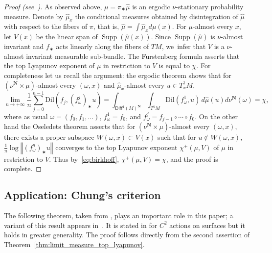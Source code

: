 \documentclass[11pt]{article}
\newcommand{\norm}[1]{{\left\Vert#1\right\Vert}}
\newcommand{\unsur}[1]{\frac{1}{#1}}
\DeclareMathOperator{\supp}{Supp}
\def\N{\mathbf{N}}
\newcommand{\dil}{{\mathrm{Dil}}}
\newcommand\Diff{{\mathsf{Diff}}}
\theoremstyle{plain}
\theoremstyle{definition}
\numberwithin{equation}{section}
\begin{document}
\begin{proof}[Proof (see~\cite{chung, hurtado:burnside})]
As observed above, $\mu = \pi_\varstar \hat \mu$ is an
ergodic $\nu$-stationary probability measure. Denote by $\hat\mu_x$ the conditional measures obtained
by disintegration of $\hat\mu$ with respect to the fibers of $\pi$, that is,
$\hat\mu = \int \hat\mu_x d\mu(x)$. For $\mu$-almost every $x$, let $V(x)$ be the linear span of
$\supp(\hat \mu(x))$. Since $\supp(\hat\mu)$ is $\nu$-almost invariant and
$f_\varstar $ acts linearly along the fibers of $TM$, we~infer that $V$ is a $\nu$-almost invariant
measurable sub-bundle. The Furstenberg formula asserts that
the top Lyapunov exponent of $\mu$ in restriction
to $V$ is equal to $\chi$. For completeness let us recall the argument:
the ergodic theorem shows that for $(\nu^\N\times \mu)$-almost every $(\omega, x)$
and $\hat\mu_x$-almost every $u\in T^1_xM$,\vspace*{-3pt}
\begin{equation}\label{eq:birkhoff}
\lim_{n\to + \infty} \frac{1}{n} \sum_{j=0}^{n-1} \dil\left( f_j, (f^j_\omega)_\varstar u \right) = \int_{\Diff^1(M)^\N} \int_{T^1M} \dil(f^1_\omega, u) \, d\hat\mu( u) d\nu^{\N}(\omega) = \chi,
\end{equation}
where as usual
$\omega=(f_0, f_1, \ldots)$, $f^1_\omega=f_0$, and $f^j_\omega= f_{j-1}\circ \cdots \circ f_0$.
On the other hand the Oseledets theorem asserts that for
$(\nu^\N\times \mu)$-almost every $(\omega, x)$, there exists a proper subspace
$W(\omega, x)\subset V(x)$ such that for $u\notin W(\omega, x)$,
$\unsur{n} \log\norm{(f^n_\omega)_\varstar u}$ converges to the top Lyapunov exponent $\chi^+(\mu, V)$
of $\mu$ in restriction to $V$. Thus by~\eqref{eq:birkhoff}, $\chi^+(\mu, V)=\chi$, and the proof is complete.
\end{proof}

\subsection{Application: Chung's criterion}

The following theorem, taken from \cite[Prop.\,3.17]{chung},
plays an important role in this paper; a variant of this result appears in~\cite{brown-fisher-hurtado}.
It is stated in \cite{chung} for $C^2$ actions on surfaces but
it holds in greater generality. The proof follows directly from the second assertion of Theorem~\ref{thm:limit_measure_top_lyapunov}.\enlargethispage{\baselineskip}%
\end{document}
